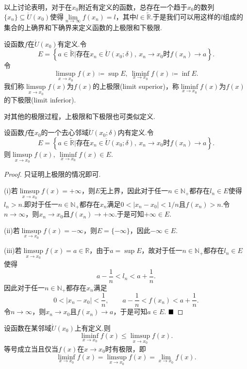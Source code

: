 以上讨论表明，对于在$x_0$附近有定义的函数，总存在一个趋于$x_0$的数列$\{x_n\}\subseteq \mathring{U}(x_0)$使得$\lim\limits_{n\to\infty}f(x_n)=l$，其中$l\in\widetilde{\mathbb{R}}$.于是我们可以用这样的$l$组成的集合的上确界和下确界来定义函数的上极限和下极限.
\begin{definition}
	设函数$f$在$\mathring{U}(x_0)$有定义.令
	$$E=\left\{a\in \widetilde{\mathbb{R}}|\text{存在}x_n\in\mathring{U}(x_0;\delta),\ x_n\to x_0\text{时}f(x_n)\to a\right\}.$$
	令
	$$\limsup\limits_{x\to x_0}f(x)\coloneqq\sup E,\ \liminf\limits_{x\to x_0}f(x)\coloneqq\inf E.$$
	我们称$\limsup\limits_{x\to x_0}f(x)$为$f(x)$的{\heiti 上极限}(limit superior)，称$\liminf\limits_{x\to x_0}f(x)$为$f(x)$的{\heiti 下极限}(limit inferior).
\end{definition}
\begin{remark}
	对其他的极限过程，上极限和下极限也可类似定义.
\end{remark}
\begin{proposition}
	设函数$f$在$x_0$的一个去心邻域$\mathring{U}(x_0;\delta)$内有定义.令
	$$E=\left\{a\in \widetilde{\mathbb{R}}|\text{存在}x_n\in\mathring{U}(x_0;\delta),\ x_n\to x_0\text{时}f(x_n)\to a\right\}.$$
	则$\limsup\limits_{x\to x_0}f(x),\ \liminf\limits_{x\to x_0}f(x)\in E$.
\end{proposition}
\begin{proof}
	只证明上极限的情况即可.
	
	(i)若$\limsup\limits_{x\to x_0}f(x)=+\infty$，则$E$无上界，因此对于任一$n\in\mathbb{N}_+$都存在$l_n\in E$使得$l_n>n$.即对于任一$n\in\mathbb{N}_+$都存在$x_n$满足$0<|x_n-x_0|<1/n$且$f(x_n)>n$.令$n\to \infty$，则$x_n\to x_0$且$f(x_n)\to +\infty$.于是可知$+\infty\in E$.
	
	(ii)若$\limsup\limits_{x\to x_0}f(x)=-\infty$，则$E=\{-\infty\}$，因此$-\infty\in E$.
	
	(iii)若$\limsup\limits_{x\to x_0}f(x)=a\in\mathbb{R}$，由于$a=\sup E$，故对于任一$n\in \mathbb{N}_+$都存在$l_n\in E$使得
	$$a-\frac{1}{n}<l_n<a+\frac{1}{n}.$$
	因此对于任一$n\in \mathbb{N}_+$都存在$x_n$满足
	$$0<|x_n-x_0|<\frac{1}{n},\qquad a-\frac{1}{n}<f(x_n)<a+\frac{1}{n}.$$
	令$n\to \infty$，则$x_n\to x_0$且$f(x_n)\to a$，于是可知$a\in E$.
	$\hfill\blacksquare$
\end{proof}
\begin{theorem}
	设函数在某邻域$\mathring{U}(x_0)$上有定义.则
	$$\liminf\limits_{x\to x_0}f(x)\leqslant \limsup\limits_{x\to x_0}f(x).$$
	等号成立当且仅当$f(x)$在$x\to x_0$时有极限，即
	$$\liminf\limits_{x\to x_0}f(x)= \limsup\limits_{x\to x_0}f(x)=\lim\limits_{x\to x_0}f(x).$$
\end{theorem}
